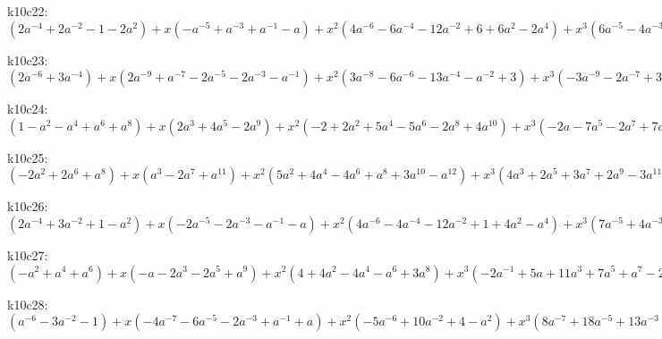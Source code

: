 k10c22: $ (2a^{-4}+2a^{-2}-1-2a^{2}) +x(-a^{-5}+a^{-3}+a^{-1}-a) +x^{2}(4a^{-6}-6a^{-4}-12a^{-2}+6+6a^{2}-2a^{4}) +x^{3}(6a^{-5}-4a^{-3}+7a-3a^{3}) +x^{4}(-4a^{-6}+6a^{-4}+16a^{-2}-1-6a^{2}+a^{4}) +x^{5}(-7a^{-5}-a^{-1}-6a+2a^{3}) +x^{6}(a^{-6}-6a^{-4}-12a^{-2}-2+3a^{2}) +x^{7}(2a^{-5}-a^{-3}+3a) +x^{8}(2a^{-4}+4a^{-2}+2) +x^{9}(a^{-3}+a^{-1}) $

k10c23: $ (2a^{-6}+3a^{-4}) +x(2a^{-9}+a^{-7}-2a^{-5}-2a^{-3}-a^{-1}) +x^{2}(3a^{-8}-6a^{-6}-13a^{-4}-a^{-2}+3) +x^{3}(-3a^{-9}-2a^{-7}+3a^{-5}+9a^{-3}+5a^{-1}-2a) +x^{4}(-5a^{-8}+5a^{-6}+20a^{-4}+3a^{-2}-7) +x^{5}(a^{-9}-2a^{-7}-2a^{-5}-9a^{-3}-9a^{-1}+a) +x^{6}(2a^{-8}-3a^{-6}-13a^{-4}-5a^{-2}+3) +x^{7}(2a^{-7}+a^{-5}+3a^{-3}+4a^{-1}) +x^{8}(2a^{-6}+5a^{-4}+3a^{-2}) +x^{9}(a^{-5}+a^{-3}) $

k10c24: $ (1-a^{2}-a^{4}+a^{6}+a^{8}) +x(2a^{3}+4a^{5}-2a^{9}) +x^{2}(-2+2a^{2}+5a^{4}-5a^{6}-2a^{8}+4a^{10}) +x^{3}(-2a-7a^{5}-2a^{7}+7a^{9}) +x^{4}(1-3a^{2}-5a^{4}+6a^{6}+3a^{8}-4a^{10}) +x^{5}(2a-2a^{3}+a^{5}-2a^{7}-7a^{9}) +x^{6}(3a^{2}+a^{4}-8a^{6}-5a^{8}+a^{10}) +x^{7}(3a^{3}+a^{5}+2a^{9}) +x^{8}(2a^{4}+4a^{6}+2a^{8}) +x^{9}(a^{5}+a^{7}) $

k10c25: $ (-2a^{2}+2a^{6}+a^{8}) +x(a^{3}-2a^{7}+a^{11}) +x^{2}(5a^{2}+4a^{4}-4a^{6}+a^{8}+3a^{10}-a^{12}) +x^{3}(4a^{3}+2a^{5}+3a^{7}+2a^{9}-3a^{11}) +x^{4}(-4a^{2}-3a^{4}+3a^{6}-5a^{8}-6a^{10}+a^{12}) +x^{5}(-6a^{3}-7a^{5}-9a^{7}-5a^{9}+3a^{11}) +x^{6}(a^{2}-3a^{4}-8a^{6}+a^{8}+5a^{10}) +x^{7}(2a^{3}+2a^{5}+5a^{7}+5a^{9}) +x^{8}(2a^{4}+5a^{6}+3a^{8}) +x^{9}(a^{5}+a^{7}) $

k10c26: $ (2a^{-4}+3a^{-2}+1-a^{2}) +x(-2a^{-5}-2a^{-3}-a^{-1}-a) +x^{2}(4a^{-6}-4a^{-4}-12a^{-2}+1+4a^{2}-a^{4}) +x^{3}(7a^{-5}+4a^{-3}+5a^{-1}+5a-3a^{3}) +x^{4}(-4a^{-6}+4a^{-4}+14a^{-2}-2-7a^{2}+a^{4}) +x^{5}(-7a^{-5}-6a^{-3}-9a^{-1}-7a+3a^{3}) +x^{6}(a^{-6}-5a^{-4}-12a^{-2}-1+5a^{2}) +x^{7}(2a^{-5}+a^{-3}+4a^{-1}+5a) +x^{8}(2a^{-4}+5a^{-2}+3) +x^{9}(a^{-3}+a^{-1}) $

k10c27: $ (-a^{2}+a^{4}+a^{6}) +x(-a-2a^{3}-2a^{5}+a^{9}) +x^{2}(4+4a^{2}-4a^{4}-a^{6}+3a^{8}) +x^{3}(-2a^{-1}+5a+11a^{3}+7a^{5}+a^{7}-2a^{9}) +x^{4}(-7-3a^{2}+7a^{4}-3a^{6}-6a^{8}) +x^{5}(a^{-1}-8a-14a^{3}-12a^{5}-6a^{7}+a^{9}) +x^{6}(3-2a^{2}-9a^{4}-a^{6}+3a^{8}) +x^{7}(4a+6a^{3}+6a^{5}+4a^{7}) +x^{8}(3a^{2}+6a^{4}+3a^{6}) +x^{9}(a^{3}+a^{5}) $

k10c28: $ (a^{-6}-3a^{-2}-1) +x(-4a^{-7}-6a^{-5}-2a^{-3}+a^{-1}+a) +x^{2}(-5a^{-6}+10a^{-2}+4-a^{2}) +x^{3}(8a^{-7}+18a^{-5}+13a^{-3}-2a^{-1}-4a+a^{3}) +x^{4}(12a^{-6}+11a^{-4}-12a^{-2}-8+3a^{2}) +x^{5}(-5a^{-7}-12a^{-5}-18a^{-3}-6a^{-1}+5a) +x^{6}(-9a^{-6}-16a^{-4}-a^{-2}+6) +x^{7}(a^{-7}+4a^{-3}+5a^{-1}) +x^{8}(2a^{-6}+5a^{-4}+3a^{-2}) +x^{9}(a^{-5}+a^{-3}) $

